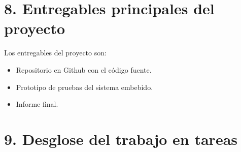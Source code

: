 \documentclass[
11pt, %
]{plan}
\begin{document}
\section{8. Entregables principales del proyecto}
\label{sec:entregables}

Los entregables del proyecto son:

\begin{itemize}
	\item Repositorio en Github con el código fuente.
	\item Prototipo de pruebas del sistema embebido.
	\item Informe final.
\end{itemize}

\section{9. Desglose del trabajo en tareas}
\label{sec:wbs}
\end{document}
